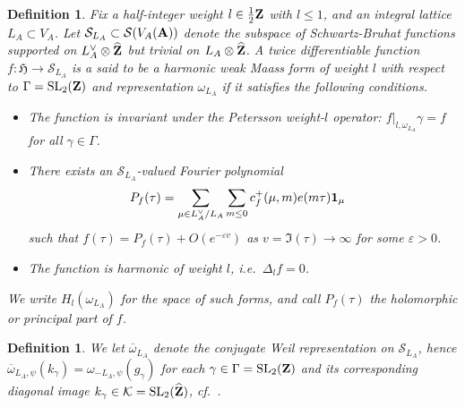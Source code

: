 \documentclass{amsart}
\newtheorem{definition}[theorem]{Definition}
\theoremstyle{definition}
\begin{document}
\begin{definition} Fix a half-integer weight $l \in \frac{1}{2}{\bf{Z}}$ with $l \leq 1$, and an integral lattice $L_A \subset V_A$.
Let $\mathcal{S}_{L_A} \subset \mathcal{S}(V_A ({\bf{A}}))$ denote the subspace of Schwartz-Bruhat functions supported on $L_A^{\vee} \otimes \widehat{\bf{Z}}$
but trivial on $L_A \otimes \widehat{\bf{Z}}$. A twice differentiable function $f: \mathfrak{H} \longrightarrow \mathcal{S}_{L_A}$ is a said to be a
{\it{harmonic weak Maass form of weight $l$ with respect to $\Gamma = \operatorname{SL}_2({\bf{Z}})$ and representation $\omega_{L_A}$}} if it satisfies the following conditions. \\ 

\begin{itemize}

\item[(i)] The function is invariant under the Petersson weight-$l$ operator: $f \vert_{l, \omega_{L_A}} \gamma = f$ for all $\gamma \in \Gamma$. \\

\item[(ii)] There exists an $\mathcal{S}_{L_A}$-valued Fourier polynomial 
\begin{align*} P_f(\tau) &= \sum\limits_{\mu \in L_A^{\vee}/L_A} 
\sum_{m \leq 0} c_f^+(\mu, m) e(m \tau) {\bf{1}}_{\mu} \end{align*}
such that $ f(\tau) = P_f(\tau) + O(e^{- \varepsilon v})$ as $v = \Im(\tau) \rightarrow \infty$ for some $\varepsilon >0$. \\

\item[(iii)] The function is harmonic of weight $l$, i.e.~$\Delta_l f = 0$. \\

\end{itemize} We write $H_l(\omega_{L_A})$ for the space of such forms, and call $P_f(\tau)$ the holomorphic or principal part of $f$.

\end{definition}

\begin{definition} We let $\overline{\omega}_{L_A}$ denote the conjugate Weil representation on $\mathcal{S}_{L_A}$, 
hence $\overline{\omega}_{L_A, \psi}(k_{\gamma}) = \omega_{-L_A, \psi}(g_{\gamma})$ 
for each $\gamma \in \Gamma = \operatorname{SL}_2({\bf{Z}})$ and its corresponding diagonal image 
$k_{\gamma} \in \mathcal{K} = \operatorname{SL}_2(\widehat{\bf{Z}})$, cf.~\cite[(2.7)]{BY}.  \end{definition}
\end{document}
